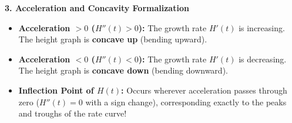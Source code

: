 \documentclass[10.5pt]{article}
\begin{document}
\vspace{0.04in}

\textbf{\large 3. Acceleration and Concavity Formalization}

\begin{tcolorbox}[colback=chalkblue!6, colframe=chalkblue, boxrule=1pt, arc=3pt, left=8pt, right=8pt, top=4pt, bottom=4pt]
\begin{itemize}[leftmargin=1.2em, topsep=1pt, itemsep=3pt]
  \item \textbf{Acceleration $> 0$ ($H''(t) > 0$):} The growth rate $H'(t)$ is increasing. The height graph is \textbf{concave up} (bending upward).
  \item \textbf{Acceleration $< 0$ ($H''(t) < 0$):} The growth rate $H'(t)$ is decreasing. The height graph is \textbf{concave down} (bending downward).
  \item \textbf{Inflection Point of $H(t)$:} Occurs wherever acceleration passes through zero ($H''(t) = 0$ with a sign change), corresponding exactly to the peaks and troughs of the rate curve!
\end{itemize}
\end{tcolorbox}
\end{document}
